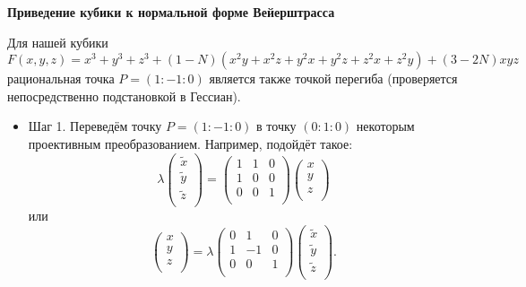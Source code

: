 \documentclass[a4paper,12pt]{article}
\theoremstyle{definition}
\begin{document}
    \begin{center}
        \textbf{Приведение кубики к нормальной форме Вейерштрасса}
    \end{center}

    Для нашей кубики 
    \[
    F(x, y, z) = x^3 + y^3 + z^3 + (1 - N) (x^2 y + x^2 z + y^2 x + y^2 z + z^2 x + z^2 y) +
    (3 - 2 N) x y z 
    \] 
    рациональная точка \(P = (1 : -1 : 0)\) является также точкой перегиба
    (проверяется непосредственно подстановкой в Гессиан).

    \begin{itemize}[leftmargin=1cm]
        \item Шаг 1. Переведём точку \(P = (1 : -1 : 0)\) в точку
        \((0 : 1 : 0)\) некоторым проективным преобразованием. Например,
        подойдёт такое:
        \[
        \lambda
        \begin{pmatrix}
            \widetilde{x} \\
            \widetilde{y} \\
            \widetilde{z} \\
        \end{pmatrix} 
        = 
        \begin{pmatrix}
            1 & 1 & 0 \\
            1 & 0 & 0 \\
            0 & 0 & 1 \\
        \end{pmatrix}
        \begin{pmatrix}
            x \\
            y \\
            z \\
        \end{pmatrix}
        \]
        или
        \[
        \begin{pmatrix}
            x \\
            y \\
            z \\
        \end{pmatrix} =
        \lambda
        \begin{pmatrix}
            0 & 1 & 0 \\
            1 & -1 & 0 \\
            0 & 0 & 1 \\
        \end{pmatrix}
        \begin{pmatrix}
            \widetilde{x} \\
            \widetilde{y} \\
            \widetilde{z} \\
        \end{pmatrix} 
        .\] 
        


\end{itemize}
\end{document}
